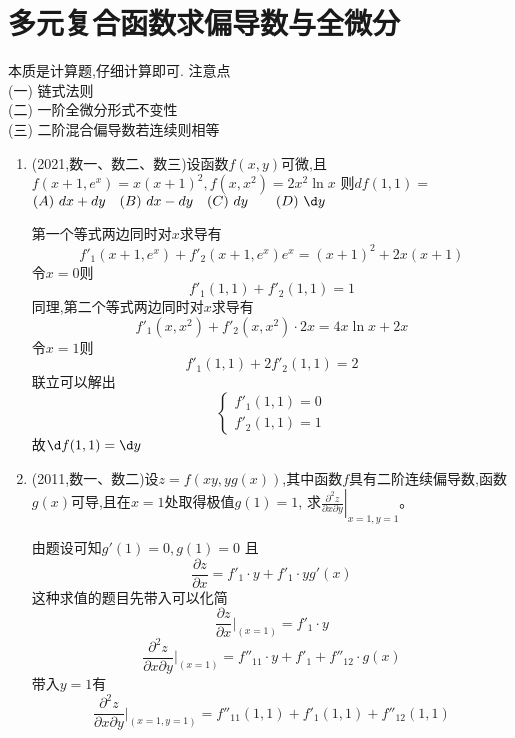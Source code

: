 \documentclass[12pt, a4paper, oneside, UTF8]{ctexbook}
\begin{document}
\section{多元复合函数求偏导数与全微分}

\begin{remark}
    本质是计算题,仔细计算即可. 注意点 \\
    (一) 链式法则 \\
    (二) 一阶全微分形式不变性 \\
    (三) 二阶混合偏导数若连续则相等 
\end{remark}

\begin{enumerate}[label=\arabic*.,start=4]
    \item (2021,数一、数二、数三)设函数$f(x,y)$可微,且$f(x+1,e^x)=x(x+1)^2,f(x,x^2)=2x^2\ln x$
    则$df(1,1)=$ \\
    $(A)\ dx+dy \quad (B)\ dx-dy \quad (C)\ dy\qquad (D)\ \d y$
    
    \begin{solution}
    第一个等式两边同时对$x$求导有
    $$
    f'_1(x+1,e^x)+f'_2(x+1,e^x)e^x=(x+1)^2+2x(x+1)
    $$
    令$x=0$则
    $$
    f'_1(1,1)+f'_2(1,1)=1
    $$
    同理,第二个等式两边同时对$x$求导有
    $$
    f'_1(x,x^2)+f'_2(x,x^2)\cdot 2x = 4x\ln{x}+2x 
    $$
    令$x=1$则
    $$
    f'_1(1,1)+2f'_2(1,1)=2
    $$
    联立可以解出
    $$
    \begin{cases}
        f'_1{(1,1)}=0 \\
        f'_2{(1,1)}=1
    \end{cases}
    $$
    故$\d f(1,1)=\d y$
    \end{solution}
    
    \item (2011,数一、数二)设$z=f(xy,yg(x))$,其中函数$f$具有二阶连续偏导数,函数$g(x)$可导,且在$x=1$处取得极值$g(1)=1$,
    求$\displaystyle\left.\frac{\partial^2 z}{\partial x\partial y}\right|_{x=1,y=1}$。
    
    \begin{solution}
    由题设可知$g'(1)=0,g(1)=0$ 且
    $$
    \frac{\partial z}{\partial x} = f'_1\cdot y + f'_1\cdot y g'(x) 
    $$
    {\color{red}这种求值的题目先带入可以化简} 
    $$
    \frac{\partial z}{\partial x}\big|_{(x=1)} = f'_1\cdot y 
    $$
    $$
    \frac{\partial^2 z}{\partial x\partial y}\big|_{(x=1)} = f''_{11}\cdot y + f'_1 + f''_{12}\cdot g(x) 
    $$
    带入$y=1$有
    $$
    \frac{\partial^2 z}{\partial x\partial y}\big|_{(x=1,y=1)} = f''_{11}(1,1)+f'_{1}(1,1)+f''_{12}(1,1)
    $$
    \end{solution}
\end{enumerate}
\end{document}
